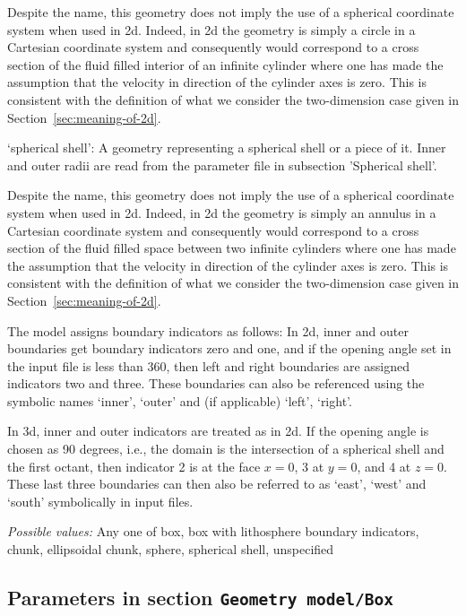 \begin{itemize}
Despite the name, this geometry does not imply the use of a spherical coordinate system when used in 2d. Indeed, in 2d the geometry is simply a circle in a Cartesian coordinate system and consequently would correspond to a cross section of the fluid filled interior of an infinite cylinder where one has made the assumption that the velocity in direction of the cylinder axes is zero. This is consistent with the definition of what we consider the two-dimension case given in Section~\ref{sec:meaning-of-2d}.

`spherical shell': A geometry representing a spherical shell or a piece of it. Inner and outer radii are read from the parameter file in subsection 'Spherical shell'.

Despite the name, this geometry does not imply the use of a spherical coordinate system when used in 2d. Indeed, in 2d the geometry is simply an annulus in a Cartesian coordinate system and consequently would correspond to a cross section of the fluid filled space between two infinite cylinders where one has made the assumption that the velocity in direction of the cylinder axes is zero. This is consistent with the definition of what we consider the two-dimension case given in Section~\ref{sec:meaning-of-2d}.

The model assigns boundary indicators as follows: In 2d, inner and outer boundaries get boundary indicators zero and one, and if the opening angle set in the input file is less than 360, then left and right boundaries are assigned indicators two and three. These boundaries can also be referenced using the symbolic names `inner', `outer' and (if applicable) `left', `right'.

In 3d, inner and outer indicators are treated as in 2d. If the opening angle is chosen as 90 degrees, i.e., the domain is the intersection of a spherical shell and the first octant, then indicator 2 is at the face $x=0$, 3 at $y=0$, and 4 at $z=0$. These last three boundaries can then also be referred to as `east', `west' and `south' symbolically in input files.


{\it Possible values:} Any one of box, box with lithosphere boundary indicators, chunk, ellipsoidal chunk, sphere, spherical shell, unspecified
\end{itemize}



\subsection{Parameters in section \tt Geometry model/Box}
\label{parameters:Geometry_20model/Box}

